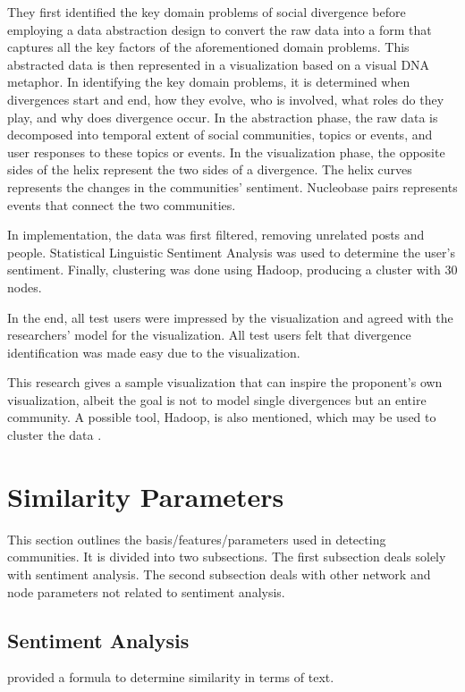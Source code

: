 They first identified the key domain problems of social divergence before employing a data abstraction design to convert the raw data into a form that captures all the key factors of the aforementioned domain problems. This abstracted data is then represented in a visualization based on a visual DNA metaphor. In identifying the key domain problems, it is determined when divergences start and end, how they evolve, who is involved, what roles do they play, and why does divergence occur. In the abstraction phase, the raw data is decomposed into temporal extent of social communities, topics or events, and user responses to these topics or events. In the visualization phase, the opposite sides of the helix represent the two sides of a divergence. The helix curves represents the changes in the communities’ sentiment. Nucleobase pairs represents events that connect the two communities. 

In implementation, the data was first filtered, removing unrelated posts and people. Statistical Linguistic Sentiment Analysis was used to determine the user’s sentiment. Finally, clustering was done using Hadoop, producing a cluster with 30 nodes. 

In the end, all test users were impressed by the visualization and agreed with the researchers’ model for the visualization. All test users felt that divergence identification was made easy due to the visualization. 

This research gives a sample visualization that can inspire the proponent’s own visualization, albeit the goal is not to model single divergences but an entire community. A possible tool, Hadoop, is also mentioned, which may be used to cluster the data \cite{Cao:2015}.

\section{Similarity Parameters}
This section outlines the basis/features/parameters used in detecting communities. It is divided into two subsections. The first subsection deals solely with sentiment analysis. The second subsection deals with other network and node parameters not related to sentiment analysis. 

\subsection{Sentiment Analysis}

 provided a formula to determine similarity in terms of text. 

